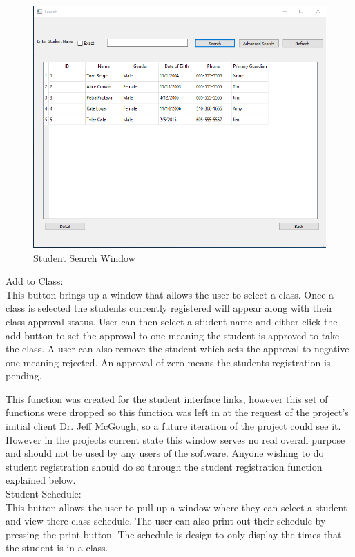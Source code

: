 \begin{figure}
  \includegraphics[width=\linewidth]{pics/userGuide/searchStudents.png}
  \caption{Student Search Window}
  \label{fig:User doc: Student Search}
\end{figure}

Add to Class:\\
This button brings up a window that allows the user to select a class. Once a class is selected the students currently registered will appear along with their class approval status. User can then select a student name and either click the add button to set the approval to one meaning the student is approved to take the class. A user can also remove the student which sets the approval to negative one meaning rejected. An approval of zero means the students registration is pending.

This function was created for the student interface links, however this set of functions were dropped so this function was left in at the request of the project's initial client Dr. Jeff McGough, so a future iteration of the project could see it. However in the projects current state this window serves no real overall purpose and should not be used by any users of the software. Anyone wishing to do student registration should do so through the student registration function explained below.\\

Student Schedule:\\
This button allows the user to pull up a window where they can select a student and view there class schedule. The user can also print out their schedule by pressing the print button. The schedule is design to only display the times that the student is in a class.\\

